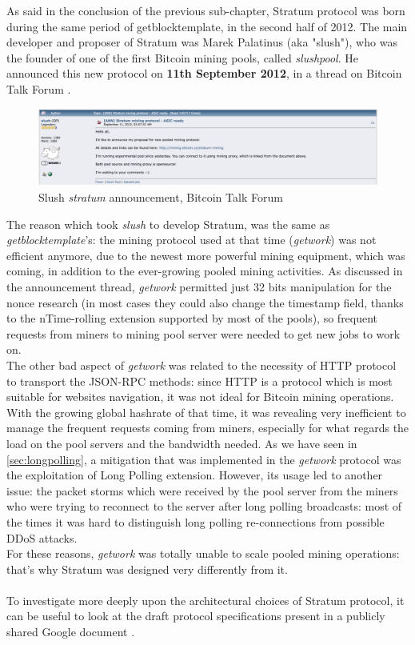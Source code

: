 As said in the conclusion of the previous sub-chapter, Stratum protocol was born during the same period of getblocktemplate, in the second half of 2012.
The main developer and proposer of Stratum was Marek Palatinus (aka "slush"), who was the founder of one of the first Bitcoin mining pools, called \textit{slushpool}. He announced this new protocol on \textbf{11th September 2012}, in a thread on Bitcoin Talk Forum \cite{bitcointalkANNStratum}.

\begin{figure}[h!]
    \centering
    \includegraphics[width=15cm]{Figures/stratum/stratum1.png}
    \caption{Slush \textit{stratum}  announcement, Bitcoin Talk Forum}
    \label{fig:stratum1}
\end{figure}

\noindent The reason which took \textit{slush} to develop Stratum, was the same as \textit{getblocktemplate}'s: the mining protocol used at that time (\textit{getwork}) was not efficient anymore, due to the newest more powerful mining equipment, which was coming, in addition to the ever-growing pooled mining activities. 
As discussed in the announcement thread, \textit{getwork} permitted just 32 bits manipulation for the nonce research (in most cases they could also change the timestamp field, thanks to the nTime-rolling extension supported by most of the pools), so frequent requests from miners to mining pool server were needed to get new jobs to work on.\\ 
The other bad aspect of \textit{getwork} was related to the necessity of HTTP protocol to transport the JSON-RPC methods: since HTTP is a protocol which is most suitable for websites navigation, it was not ideal for Bitcoin mining operations. With the growing global hashrate of that time, it was revealing very inefficient to manage the frequent requests coming from miners, especially for what regards the load on the pool servers and the bandwidth needed.
As we have seen in \ref{sec:longpolling}, a mitigation that was implemented in the \textit{getwork} protocol was the exploitation of Long Polling extension. However, its usage led to another issue: the packet storms which were received by the pool server from the miners who were trying to reconnect to the server after long polling broadcasts: most of the times it was hard to distinguish long polling re-connections from possible DDoS attacks.\\
For these reasons, \textit{getwork} was totally unable to scale pooled mining operations: that's why Stratum was designed very differently from it.\\\\
To investigate more deeply upon the architectural choices of Stratum protocol, it can be useful to look at the draft protocol specifications present in a publicly shared Google document \cite{googleStratumNetwork}.
